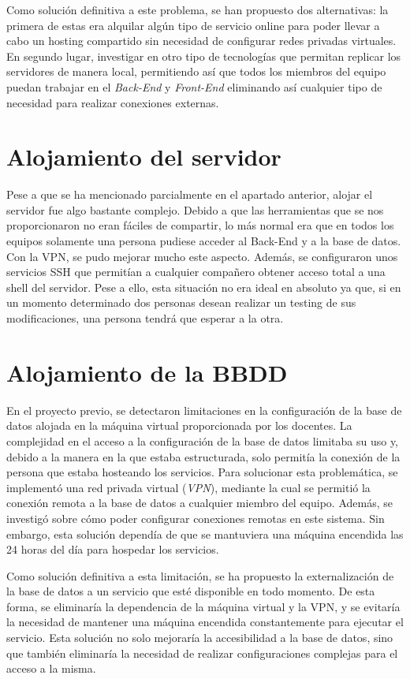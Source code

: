 \documentclass[12pt]{report}
\begin{document}
Como solución definitiva a este problema, se han propuesto dos alternativas: la primera de estas era alquilar algún tipo de servicio online para poder llevar a cabo un hosting compartido sin necesidad de configurar redes privadas virtuales. En segundo lugar, investigar en otro tipo de tecnologías que permitan replicar los servidores de manera local, permitiendo así que todos los miembros del equipo puedan trabajar en el \textit{Back-End} y \textit{Front-End} eliminando así cualquier tipo de necesidad para realizar conexiones externas.
\section{Alojamiento del servidor}
Pese a que se ha mencionado parcialmente en el apartado anterior, alojar el servidor fue algo bastante complejo. Debido a que las herramientas que se nos proporcionaron no eran fáciles de compartir, lo más normal era que en todos los equipos solamente una persona pudiese acceder al Back-End y a la base de datos. Con la VPN, se pudo mejorar mucho este aspecto. Además, se configuraron unos servicios SSH que permitían a cualquier compañero obtener acceso total a una shell del servidor. Pese a ello, esta situación no era ideal en absoluto ya que, si en un momento determinado dos personas desean realizar un testing de sus modificaciones, una persona tendrá que esperar a la otra.
\section{Alojamiento de la BBDD}
En el proyecto previo, se detectaron limitaciones en la configuración de la base de datos alojada en la máquina virtual proporcionada por los docentes. La complejidad en el acceso a la configuración de la base de datos limitaba su uso y, debido a la manera en la que estaba estructurada, solo permitía la conexión de la persona que estaba hosteando los servicios. Para solucionar esta problemática, se implementó una red privada virtual (\textit{VPN}), mediante la cual se permitió la conexión remota a la base de datos a cualquier miembro del equipo. Además, se investigó sobre cómo poder configurar conexiones remotas en este sistema. Sin embargo, esta solución dependía de que se mantuviera una máquina encendida las 24 horas del día para hospedar los servicios.

Como solución definitiva a esta limitación, se ha propuesto la externalización de la base de datos a un servicio que esté disponible en todo momento. De esta forma, se eliminaría la dependencia de la máquina virtual y la VPN, y se evitaría la necesidad de mantener una máquina encendida constantemente para ejecutar el servicio. Esta solución no solo mejoraría la accesibilidad a la base de datos, sino que también eliminaría la necesidad de realizar configuraciones complejas para el acceso a la misma.
\end{document}
